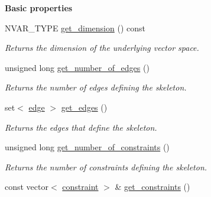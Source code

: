 \begin{Indent}\textbf{ Basic properties}\par
\begin{DoxyCompactItemize}
\item 
\mbox{\label{group___c_l_s_solvers_ac6dd4f7d7e79ab08d6cf49ad4925f5ef}} 
N\+V\+A\+R\+\_\+\+T\+Y\+PE \hyperlink{group___c_l_s_solvers_ac6dd4f7d7e79ab08d6cf49ad4925f5ef}{get\+\_\+dimension} () const
\begin{DoxyCompactList}\small\item\em Returns the dimension of the underlying vector space. \end{DoxyCompactList}\item 
\mbox{\label{group___c_l_s_solvers_a3e2662e9f9e6a0dde0459dee0b27fd1c}} 
unsigned long \hyperlink{group___c_l_s_solvers_a3e2662e9f9e6a0dde0459dee0b27fd1c}{get\+\_\+number\+\_\+of\+\_\+edges} ()
\begin{DoxyCompactList}\small\item\em Returns the number of edges defining the skeleton. \end{DoxyCompactList}\item 
\mbox{\label{group___c_l_s_solvers_adc4557716509bfeeae99f99b93953cf8}} 
set$<$ \hyperlink{group___c_l_s_solvers_classedge}{edge} $>$ \hyperlink{group___c_l_s_solvers_adc4557716509bfeeae99f99b93953cf8}{get\+\_\+edges} ()
\begin{DoxyCompactList}\small\item\em Returns the edges that define the skeleton. \end{DoxyCompactList}\item 
\mbox{\label{group___c_l_s_solvers_a0b75f0ce54e512673169b193955fc58f}} 
unsigned long \hyperlink{group___c_l_s_solvers_a0b75f0ce54e512673169b193955fc58f}{get\+\_\+number\+\_\+of\+\_\+constraints} ()
\begin{DoxyCompactList}\small\item\em Returns the number of constraints defining the skeleton. \end{DoxyCompactList}\item 
\mbox{\label{group___c_l_s_solvers_a29665cf3b04694b349f224e54f93f2db}} 
const vector$<$ \hyperlink{group___c_l_s_solvers_classconstraint}{constraint} $>$ \& \hyperlink{group___c_l_s_solvers_a29665cf3b04694b349f224e54f93f2db}{get\+\_\+constraints} ()

\end{DoxyCompactItemize}
\end{Indent}
